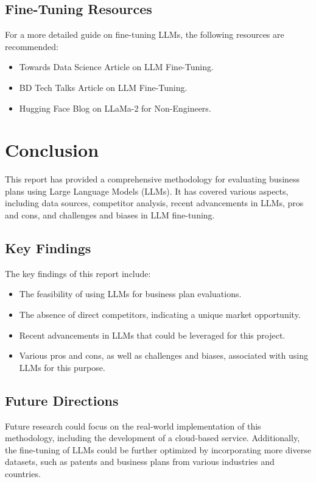 \documentclass[12pt]{article}
\begin{document}
	\subsection{Fine-Tuning Resources}
	For a more detailed guide on fine-tuning LLMs, the following resources are recommended:
	\begin{itemize}
		\item Towards Data Science Article on LLM Fine-Tuning\cite{tdsfinetuning}.
		\item BD Tech Talks Article on LLM Fine-Tuning\cite{bdtechtalks}.
		\item Hugging Face Blog on LLaMa-2 for Non-Engineers\cite{huggingface}.
	\end{itemize}
	
	\section{Conclusion}
	
	This report has provided a comprehensive methodology for evaluating business plans using Large Language Models (LLMs). It has covered various aspects, including data sources, competitor analysis, recent advancements in LLMs, pros and cons, and challenges and biases in LLM fine-tuning.
	
	\subsection{Key Findings}
	The key findings of this report include:
	\begin{itemize}
		\item The feasibility of using LLMs for business plan evaluations.
		\item The absence of direct competitors, indicating a unique market opportunity.
		\item Recent advancements in LLMs that could be leveraged for this project.
		\item Various pros and cons, as well as challenges and biases, associated with using LLMs for this purpose.
	\end{itemize}
	
	\subsection{Future Directions}
	Future research could focus on the real-world implementation of this methodology, including the development of a cloud-based service. Additionally, the fine-tuning of LLMs could be further optimized by incorporating more diverse datasets, such as patents and business plans from various industries and countries.
	
\end{document}
